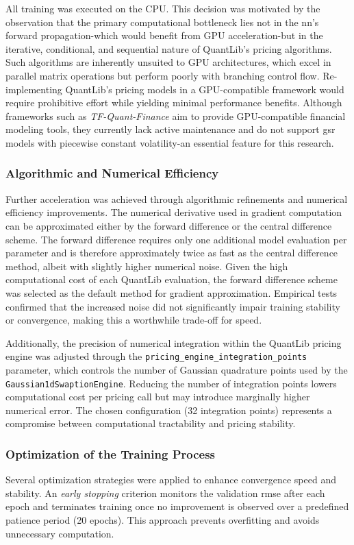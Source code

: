 All training was executed on the CPU. This decision was motivated by the observation that the primary computational bottleneck lies not in the \ac{nn}'s forward propagation-which would benefit from GPU acceleration-but in the iterative, conditional, and sequential nature of QuantLib's pricing algorithms. Such algorithms are inherently unsuited to GPU architectures, which excel in parallel matrix operations but perform poorly with branching control flow. Re-implementing QuantLib's pricing models in a GPU-compatible framework would require prohibitive effort while yielding minimal performance benefits. Although frameworks such as \textit{TF-Quant-Finance} aim to provide GPU-compatible financial modeling tools, they currently lack active maintenance and do not support \ac{gsr} models with piecewise constant volatility-an essential feature for this research.

\subsubsection{Algorithmic and Numerical Efficiency}
\label{subsubsec:algorithmic_and_numerical_efficiency}
Further acceleration was achieved through algorithmic refinements and numerical efficiency improvements. The numerical derivative used in gradient computation can be approximated either by the forward difference or the central difference scheme. The forward difference requires only one additional model evaluation per parameter and is therefore approximately twice as fast as the central difference method, albeit with slightly higher numerical noise. Given the high computational cost of each QuantLib evaluation, the forward difference scheme was selected as the default method for gradient approximation. Empirical tests confirmed that the increased noise did not significantly impair training stability or convergence, making this a worthwhile trade-off for speed.

Additionally, the precision of numerical integration within the QuantLib pricing engine was adjusted through the \texttt{pricing\_engine\_integration\_points} parameter, which controls the number of Gaussian quadrature points used by the \texttt{Gaussian1dSwaptionEngine}. Reducing the number of integration points lowers computational cost per pricing call but may introduce marginally higher numerical error. The chosen configuration (32 integration points) represents a compromise between computational tractability and pricing stability.

\subsubsection{Optimization of the Training Process}
Several optimization strategies were applied to enhance convergence speed and stability. An \textit{early stopping} criterion monitors the validation \ac{rmse} after each epoch and terminates training once no improvement is observed over a predefined patience period (20 epochs). This approach prevents overfitting and avoids unnecessary computation.

